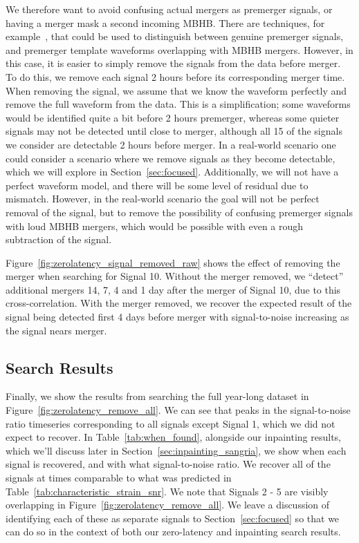 We therefore want to avoid confusing actual mergers as premerger signals, or having a merger mask a second incoming \ac{MBHB}.
There are techniques, for example~\cite{Allen:2004gu}, that could be used to distinguish between genuine premerger signals, and premerger template waveforms overlapping with \ac{MBHB} mergers.
However, in this case, it is easier to simply remove the signals from the data before merger.
To do this, we remove each signal 2 hours before its corresponding merger time.
When removing the signal, we assume that we know the waveform perfectly and remove the full waveform from the data. 
This is a simplification; some waveforms would be identified quite a bit before 2 hours premerger, whereas some quieter signals may not be detected until close to merger, although all 15 of the signals we consider are detectable 2 hours before merger.
In a real-world scenario one could consider a scenario where we remove signals as they become detectable, which we will explore in Section~\ref{sec:focused}.
Additionally, we will not have a perfect waveform model, and there will be some level of residual due to mismatch.
However, in the real-world scenario the goal will not be perfect removal of the signal, but to remove the possibility of confusing premerger signals with loud \ac{MBHB} mergers, which would be possible with even a rough subtraction of the signal.

Figure~\ref{fig:zerolatency_signal_removed_raw} shows the effect of removing the merger when searching for Signal 10.
Without the merger removed, we ``detect'' additional mergers 14, 7, 4 and 1 day after the merger of Signal 10, due to this cross-correlation.
With the merger removed, we recover the expected result of the signal being detected first 4 days before merger with signal-to-noise increasing as the signal nears merger.


\subsection{Search Results}
\label{subsec:zerolatency_results}

Finally, we show the results from searching the full year-long dataset in Figure~\ref{fig:zerolatency_remove_all}.
We can see that peaks in the signal-to-noise ratio timeseries corresponding to all signals except Signal 1, which we did not expect to recover.
In Table~\ref{tab:when_found}, alongside our inpainting results, which we'll discuss later in Section~\ref{sec:inpainting_sangria},
we show when each signal is recovered, and with what signal-to-noise ratio. We recover all of the signals at times comparable to what was predicted in Table~\ref{tab:characteristic_strain_snr}.
We note that Signals 2 - 5 are visibly overlapping in Figure~\ref{fig:zerolatency_remove_all}.
We leave a discussion of identifying each of these as separate signals to Section~\ref{sec:focused} so that we can do so in the context of both our zero-latency and inpainting search results.
